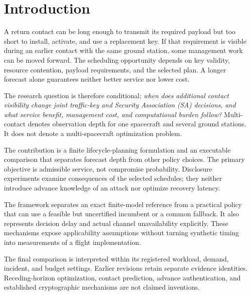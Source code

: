 \documentclass[conference]{IEEEtran}
\begin{document}

\section{Introduction}
\label{sec:introduction}

A return contact can be long enough to transmit its required
payload but too short to install, activate, and use a replacement
key.
If that requirement is visible during an earlier contact with
the same ground station, some management work can be moved
forward.
The scheduling opportunity depends on key validity, resource
contention, payload requirements, and the selected plan.
A longer forecast alone guarantees neither better service nor
lower cost.

The research question is therefore conditional:
\emph{when does additional contact visibility change joint
traffic-key and Security Association (SA) decisions, and what
service benefit, management cost, and computational burden
follow?}
Multi-contact denotes observation depth for one spacecraft and
several ground stations.
It does not denote a multi-spacecraft optimization problem.

The contribution is a finite lifecycle-planning formulation and
an executable comparison that separates forecast depth from
other policy choices.
The primary objective is admissible service, not compromise
probability.
Disclosure experiments examine consequences of the selected
schedules; they neither introduce advance knowledge of an
attack nor optimize recovery latency.

The framework separates an exact finite-model reference from
a practical policy that can use a feasible but uncertified
incumbent or a common fallback.
It also represents decision delay and actual channel
unavailability explicitly.
These mechanisms expose applicability assumptions without
turning synthetic timing into measurements of a flight
implementation.

The final comparison is interpreted within its registered
workload, demand, incident, and budget settings.
Earlier revisions retain separate evidence identities.
Receding-horizon optimization, contact prediction, advance
authentication, and established cryptographic mechanisms are
not claimed inventions.

\end{document}
